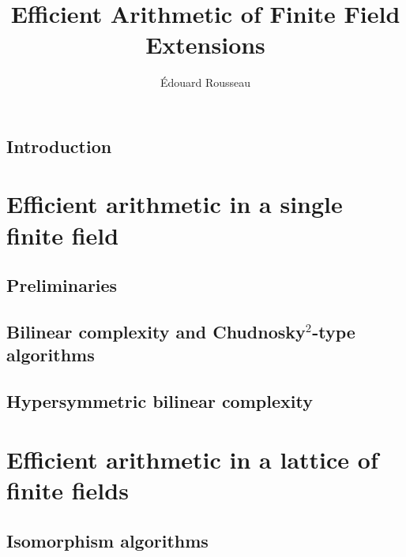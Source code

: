 \documentclass[a4paper,11pt]{report}
\title{Efficient Arithmetic of Finite Field Extensions}
\author{Édouard Rousseau}
\begin{document}
\maketitle



\dominitoc
\tableofcontents


%

\chapter{Introduction}


\part{Efficient arithmetic in a single finite field}
\label{part:single}

\chapter{Preliminaries}
\label{chap:preliminary}


\chapter{Bilinear complexity and Chudnosky$^2$-type algorithms}
\label{chap:bilinear}


\chapter{Hypersymmetric bilinear complexity}
\label{chap:hypersymmetric}


\part{Efficient arithmetic in a lattice of finite fields}
\label{part:lattice}

\chapter{Isomorphism algorithms}
\label{chap:isomorphism}

\end{document}
